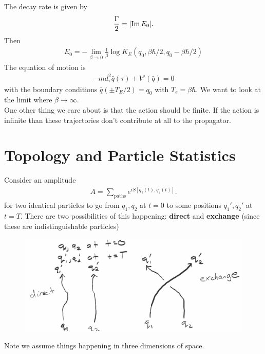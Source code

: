 \documentclass{book}
\theoremstyle{definition}
\newcommand{\be}{\beta}
\newcommand{\f}[2]{\frac{#1}{#2}}
\begin{document}
The decay rate is given by
\begin{align}
\f{\Gamma}{2} = \abs{\Im E_0}.
\end{align}
Then 
\begin{align}
E_0 = -\lim_{\beta \to 0}\f{1}{\beta}\log K_E(q_0 ,\be\hbar/2, q_0 -\beta\hbar/2)
\end{align}
The equation of motion is 
\begin{align}
-m d_\tau^2 \bar{q}(\tau) + V'(\bar{q}) = 0
\end{align}
with the boundary conditions $\bar{q}(\pm T_E/2) = q_0$ with $T_e = \beta\hbar$. We want to look at the limit where $\beta \to \infty$.\\

One other thing we care about is that the action should be finite. If the action is infinite than these trajectories don't contribute at all to the propagator.  

\newpage


\section{Topology and Particle Statistics}

Consider an amplitude 
\begin{align}
A = \sum_{\text{paths}} e^{iS[q_1(t),q_2(t)]}.
\end{align}
for two identical particles to go from $q_1, q_2$ at $t=0$ to some positions $q_1', q_2'$ at $t=T$. There are two possibilities of this happening: \textbf{direct} and \textbf{exchange} (since these are indistinguishable particles)
\begin{figure}[!htb]
	\centering
	\includegraphics[scale=0.2]{paths}
\end{figure}
Note we assume things happening in three dimensions of space. \\ 
\end{document}
